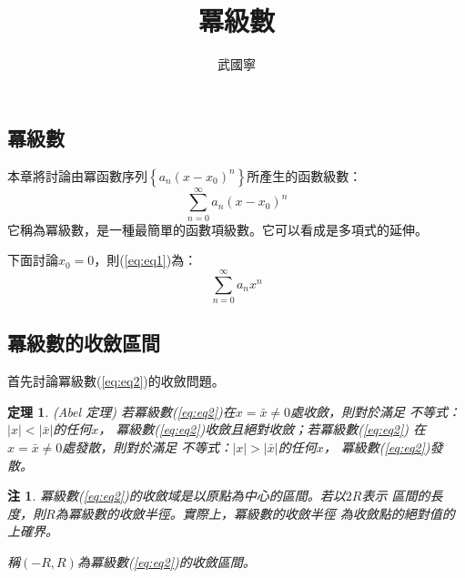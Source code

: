 \documentclass[a4paper,12pt]{article}
\theoremstyle{theorem}
\begin{document}
\begin{CJK*}{UTF8}{bsmi}
    \newtheorem{theorem}{定理}[section]
    \newtheorem{lemma}{引理}[section]
    \newtheorem{definition}{定義}[section]
    \newtheorem{example}{例子}[section]
    \newtheorem{corollary}{推論}[section]
    \newtheorem{remark}{注}[section]
    \let\oldref\ref
    \renewcommand{\ref}[1]{\rm{(\oldref{#1})}}
    \renewcommand{\headrulewidth}{0.4pt}
    \renewcommand{\footrulewidth}{0.4pt}

    \title{冪級數}
    \author{武國寧}
    \date{}
    \maketitle

    \section{冪級數}
    \indent 本章將討論由冪函數序列$\left\{a_n(x - x_0)^n\right\}$所產生的函數級數：
    \begin{equation}
        \sum_{n=0}^{\infty}a_n(x - x_0)^n
        \label{eq:eq1}
    \end{equation}
    它稱為冪級數，是一種最簡單的函數項級數。它可以看成是多項式的延伸。

    \indent 下面討論$x_0 = 0$，則\ref{eq:eq1}為：
    \begin{equation}
        \sum_{n=0}^{\infty}a_n x^n
        \label{eq:eq2}
    \end{equation}
    \subsection{冪級數的收斂區間}
    \indent 首先討論冪級數\ref{eq:eq2}的收斂問題。
    \begin{theorem}{\rm(Abel 定理)}
        若冪級數\ref{eq:eq2}在$x = \bar{x} \ne 0$處收斂，則對於滿足
        不等式：$\vert x \vert < \vert \bar{x} \vert$的任何$x$，
        冪級數\ref{eq:eq2}收斂且絕對收斂；若冪級數\ref{eq:eq2}
        在$x = \bar{x} \ne 0$處發散，則對於滿足
        不等式：$\vert x \vert > \vert \bar{x} \vert$的任何$x$，
        冪級數\ref{eq:eq2}發散。
    \end{theorem}
    \begin{remark}
    \indent 冪級數\ref{eq:eq2}的收斂域是以原點為中心的區間。若以$2R$表示
    區間的長度，則$R$為冪級數的收斂半徑。實際上，冪級數的收斂半徑
    為收斂點的絕對值的上確界。

    \indent 稱$(-R, R)$為冪級數\ref{eq:eq2}的收斂區間。


\end{remark}
\end{CJK*}
\end{document}
